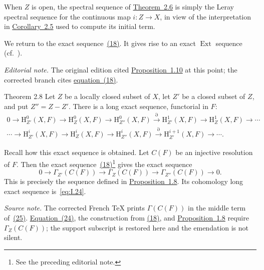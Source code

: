 When $Z$ is open, the spectral sequence of \hyperref[I.2.6]{Theorem~2.6} is simply the Leray
spectral sequence for the continuous map $i\colon Z\to X$, in view of the
interpretation in \hyperref[I.2.5]{Corollary~2.5} used to compute its initial term.

We return to the exact sequence~\hyperref[eq:I.18]{(18)}. It gives rise to an exact
$\operatorname{Ext}$ sequence (cf.\ \cite{Tohoku}).

\noindent\textit{Editorial note.} The original edition cited
\hyperref[I.1.10]{Proposition~1.10} at this point; the corrected branch cites \hyperref[eq:I.18]{equation~(18)}.

\begin{sgastatement}{Theorem 2.8}
Let $Z$ be a locally closed subset of $X$, let $Z'$ be a closed subset of
$Z$, and put $Z''=Z-Z'$. There is a long exact sequence, functorial in $F$:
\begin{equation}
\begin{gathered}
  0\longrightarrow \mathrm H_{Z'}^0(X,F)
  \longrightarrow \mathrm H_Z^0(X,F)
  \longrightarrow \mathrm H_{Z''}^0(X,F)
  \xrightarrow{\partial} \mathrm H_{Z'}^1(X,F)
  \longrightarrow \mathrm H_Z^1(X,F)\longrightarrow\cdots \\
  \cdots\longrightarrow \mathrm H_{Z'}^i(X,F)
  \longrightarrow \mathrm H_Z^i(X,F)
  \longrightarrow \mathrm H_{Z''}^i(X,F)
  \xrightarrow{\partial} \mathrm H_{Z'}^{i+1}(X,F)
  \longrightarrow\cdots .
\end{gathered}
\tag{24}\label{eq:I.24}
\end{equation}
\end{sgastatement}

Recall how this exact sequence is obtained. Let $C(F)$ be an injective
resolution of $F$. Then the exact sequence~\hyperref[eq:I.18]{(18)}\footnote{See the preceding
editorial note.} gives the exact sequence
\begin{equation}
  0\longrightarrow\Gamma_{Z'}(C(F))
  \longrightarrow\Gamma_Z(C(F))
  \longrightarrow\Gamma_{Z''}(C(F))
  \longrightarrow0.
  \tag{25}\label{eq:I.25}
\end{equation}
This is precisely the sequence defined in \hyperref[I.1.8]{Proposition~1.8}. Its cohomology
long exact sequence is~\eqref{eq:I.24}.

\noindent\textit{Source note.} The corrected French TeX prints
$\Gamma(C(F))$ in the middle term of~\hyperref[eq:I.25]{(25)}. \hyperref[eq:I.24]{Equation~(24)}, the construction
from \hyperref[eq:I.18]{(18)}, and \hyperref[I.1.8]{Proposition~1.8} require $\Gamma_Z(C(F))$; the support
subscript is restored here and the emendation is not silent.

